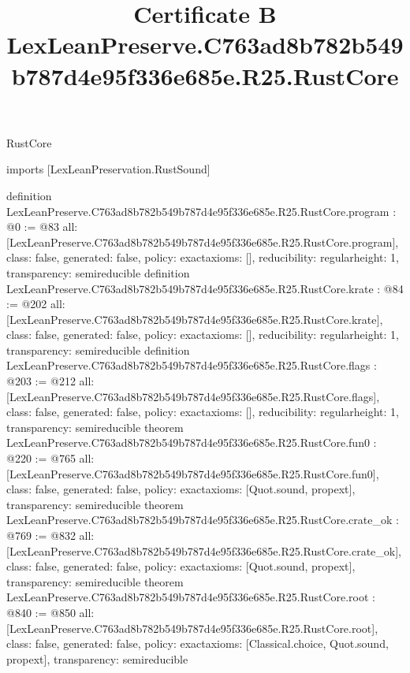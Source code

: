 \begin{lexlean}{RustCore}
\title{Certificate B LexLeanPreserve.C763ad8b782b549b787d4e95f336e685e.R25.RustCore}
\begin{coremodule}
imports [LexLeanPreservation.RustSound]

definition LexLeanPreserve.C763ad8b782b549b787d4e95f336e685e.R25.RustCore.program : @0 := @83 {
  all: [LexLeanPreserve.C763ad8b782b549b787d4e95f336e685e.R25.RustCore.program],
  class: false,
  generated: false,
  policy: exact{axioms: []},
  reducibility: regular{height: 1},
  transparency: semireducible
}
definition LexLeanPreserve.C763ad8b782b549b787d4e95f336e685e.R25.RustCore.krate : @84 := @202 {
  all: [LexLeanPreserve.C763ad8b782b549b787d4e95f336e685e.R25.RustCore.krate],
  class: false,
  generated: false,
  policy: exact{axioms: []},
  reducibility: regular{height: 1},
  transparency: semireducible
}
definition LexLeanPreserve.C763ad8b782b549b787d4e95f336e685e.R25.RustCore.flags : @203 := @212 {
  all: [LexLeanPreserve.C763ad8b782b549b787d4e95f336e685e.R25.RustCore.flags],
  class: false,
  generated: false,
  policy: exact{axioms: []},
  reducibility: regular{height: 1},
  transparency: semireducible
}
theorem LexLeanPreserve.C763ad8b782b549b787d4e95f336e685e.R25.RustCore.fun0 : @220 := @765 {
  all: [LexLeanPreserve.C763ad8b782b549b787d4e95f336e685e.R25.RustCore.fun0],
  class: false,
  generated: false,
  policy: exact{axioms: [Quot.sound, propext]},
  transparency: semireducible
}
theorem LexLeanPreserve.C763ad8b782b549b787d4e95f336e685e.R25.RustCore.crate_ok : @769 := @832 {
  all: [LexLeanPreserve.C763ad8b782b549b787d4e95f336e685e.R25.RustCore.crate_ok],
  class: false,
  generated: false,
  policy: exact{axioms: [Quot.sound, propext]},
  transparency: semireducible
}
theorem LexLeanPreserve.C763ad8b782b549b787d4e95f336e685e.R25.RustCore.root : @840 := @850 {
  all: [LexLeanPreserve.C763ad8b782b549b787d4e95f336e685e.R25.RustCore.root],
  class: false,
  generated: false,
  policy: exact{axioms: [Classical.choice, Quot.sound, propext]},
  transparency: semireducible
}


\end{coremodule}
\end{lexlean}
